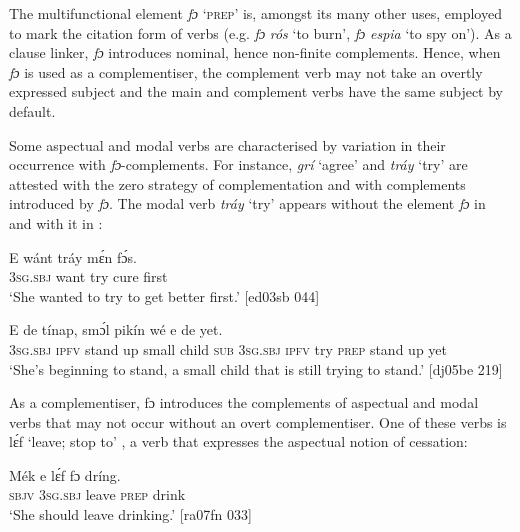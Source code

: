 The multifunctional element \textit{fɔ} ‘\textsc{prep}’ is, amongst its many other uses, employed to mark the citation form of verbs (e.g. \textit{fɔ} \textit{rós} ‘to burn’, \textit{fɔ} \textit{espia} ‘to spy on’). As a clause linker, \textit{fɔ} introduces nominal, hence non-finite complements. Hence, when \textit{fɔ} is used as a complementiser, the complement verb may not take an overtly expressed subject and the main and complement verbs have the same subject by default.


Some aspectual and modal verbs are characterised by variation in their occurrence with \textit{fɔ}{}-complements. For instance, \textit{grí} ‘agree’ and \textit{tráy} ‘try’ are attested with the zero strategy of complementation and with complements introduced by \textit{fɔ}. The modal verb \textit{tráy} ‘try’ appears without the element \textit{fɔ} in  and with it in :



\ea%
    \label{ex:key:1384}
    \gll E    wánt  tráy    mɛ́n    fɔ́s.\\
\textsc{3sg.sbj}  want  try    cure    first\\

\glt ‘She wanted to try to get better first.’ [ed03sb 044]
\z


\ea%
    \label{ex:key:1385}
    \gll E    de  tínap,  smɔ́l  pikín  wé  e    de
         yet.\\
\textsc{3sg.sbj}  \textsc{ipfv}  stand up  small  child  \textsc{sub}  \textsc{3sg.sbj}  \textsc{ipfv}
try    \textsc{prep}  stand up    yet\\

\glt ‘She’s beginning to stand, a small child that is still trying
to stand.’ [dj05be 219]
\z

As a complementiser, fɔ introduces the complements of aspectual and modal verbs that may not occur without an overt complementiser. One of these verbs is lɛ́f ‘leave; stop to’ , a verb that expresses the aspectual notion of cessation: 


\ea%
    \label{ex:key:1386}
    \gll Mék    e    lɛ́f    fɔ  dríng.\\
\textsc{sbjv}    \textsc{3sg.sbj}  leave  \textsc{prep}  drink\\

\glt ‘She should leave drinking.’ [ra07fn 033]
\z

